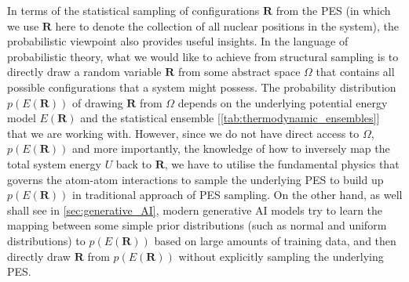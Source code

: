 In terms of the statistical sampling of configurations $\bm{R}$ from the PES (in which we use $\bm{R}$ here to denote the collection of all nuclear positions in the system), the probabilistic viewpoint also provides useful insights. In the language of probabilistic theory, what we would like to achieve from structural sampling is to directly draw a random variable $\bm{R}$ from some abstract space $\Omega$ that contains all possible configurations that a system might possess. The probability distribution $p(E(\bm{R}))$ of drawing $\bm{R}$ from $\Omega$ depends on the underlying potential energy model $E(\bm{R})$ and the statistical ensemble [\cref{tab:thermodynamic_ensembles}] that we are working with. 
However, since we do not have direct access to $\Omega$, $p(E(\bm{R}))$ and more importantly, the knowledge of how to inversely map the total system energy $U$ back to $\bm{R}$, we have to utilise the fundamental physics that governs the atom-atom interactions to sample the underlying PES to build up $p(E(\bm{R}))$ in traditional approach of PES sampling. On the other hand, as well shall see in \cref{sec:generative_AI}, modern generative AI models try to learn the mapping between some simple prior distributions (such as normal and uniform distributions) to $p(E(\bm{R}))$ based on large amounts of training data, and then directly draw $\bm{R}$ from $p(E(\bm{R}))$ without explicitly sampling the underlying PES. 

